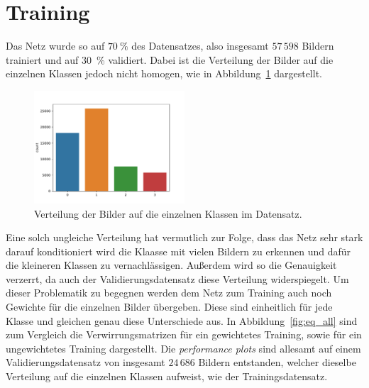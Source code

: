 \section{Training}
%
Das Netz wurde so auf $\SI{70}{\percent}$ des Datensatzes, also insgesamt
$57\,598$ Bildern trainiert und auf \SI{30}{\percent} validiert. Dabei ist die
Verteilung der Bilder auf die einzelnen Klassen jedoch nicht homogen, wie in
Abbildung~\ref{fig:count} dargestellt.
%
\begin{figure}
  \centering
  \includegraphics[width=0.5\textwidth]{Plots/countplot_smaller.pdf}
  \caption{Verteilung der Bilder auf die einzelnen Klassen im Datensatz.}
  \label{fig:count}
\end{figure}
%
Eine solch ungleiche Verteilung hat vermutlich zur Folge, dass das Netz sehr
stark darauf konditioniert wird die Klaasse mit vielen Bildern zu erkennen und
dafür die kleineren Klassen zu vernachlässigen. Außerdem wird so die
Genauigkeit verzerrt, da auch der Validierungsdatensatz diese Verteilung
widerspiegelt. Um dieser Problematik zu begegnen werden dem Netz zum Training
auch noch Gewichte für die einzelnen Bilder übergeben. Diese sind einheitlich
für jede Klasse und gleichen genau diese Unterschiede aus.
In Abbildung~\ref{fig:eq_all} sind zum Vergleich die Verwirrungsmatrizen
für ein gewichtetes Training, sowie für ein ungewichtetes Training dargestellt.
Die \textit{performance plots} sind allesamt auf einem Validierungsdatensatz
von insgesamt $24\,686$ Bildern entstanden, welcher dieselbe Verteilung auf
die einzelnen Klassen aufweist, wie der Trainingsdatensatz.
%

